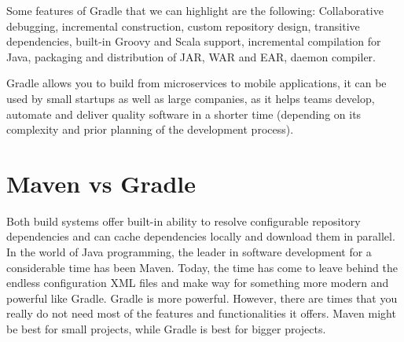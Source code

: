 \documentclass[a4paper,11pt]{article}
\begin{document}
Some features of Gradle that we can highlight are the following: Collaborative 
debugging, incremental construction, custom repository design, transitive 
dependencies, built-in Groovy and Scala support, incremental compilation for 
Java, packaging and distribution of JAR, WAR and EAR, daemon compiler.

Gradle allows you to build from microservices to mobile applications, it can 
be used by small startups as well as large companies, as it helps teams 
develop, automate and deliver quality software in a shorter time (depending on 
its complexity and prior planning of the development process)\cite{GRADLE:1}.

\section{Maven vs Gradle}
Both build systems offer built-in ability to resolve configurable repository 
dependencies and can cache dependencies locally and download them in parallel. 
In the world of Java programming, the leader in software development for a
considerable time has been Maven. Today, the time has come to leave behind the 
endless configuration XML files and make way for something more modern and 
powerful like Gradle. Gradle is more powerful. However, there are times that 
you really do not need most of the features and functionalities it offers. 
Maven might be best for small projects, while Gradle is best for bigger 
projects\cite{DZONE:1}.

\newpage
\printbibliography
\end{document}
